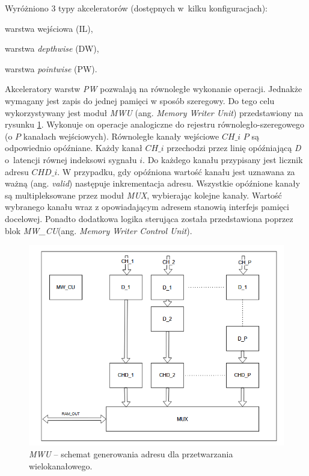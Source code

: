 Wyróżniono 3 typy akceleratorów (dostępnych w~kilku konfiguracjach):
\begin{description}
\item warstwa wejściowa (IL),
\item warstwa \emph{depthwise} (DW),
\item warstwa \emph{pointwise} (PW).
\end{description}

Akceleratory warstw \emph{PW} pozwalają na równoległe wykonanie operacji.
Jednakże wymagany jest zapis do jednej pamięci w sposób szeregowy.
Do tego celu  wykorzystywany jest moduł \emph{MWU} (ang. \emph{Memory Writer Unit}) przedstawiony na rysunku \ref{fig:mwu}.
Wykonuje on operacje analogiczne do rejestru równoległo-szeregowego (o $P$ kanałach wejściowych).
Równoległe kanały wejściowe $CH\_i$ $P$ są odpowiednio opóźniane. 
Każdy kanał $CH\_{i}$ przechodzi przez linię opóźniającą \emph{D} o~latencji równej indeksowi sygnału $i$.
Do każdego kanału przypisany jest licznik adresu $CHD\_i$.
W przypadku, gdy opóźniona wartość kanału jest uznawana za ważną (ang. \emph{valid}) następuje inkrementacja adresu.
Wszystkie opóźnione kanały są multipleksowane przez moduł \emph{MUX}, wybierając kolejne kanały.
Wartość wybranego kanału wraz z opowiadającym adresem stanowią interfejs pamięci docelowej.
Ponadto dodatkowa logika sterująca została przedstawiona poprzez blok \emph{MW\_CU}(ang. \emph{Memory Writer Control Unit}).
\begin{figure}
    \centering
    \includegraphics[width=0.8\linewidth]{images/MWU.png}
    \caption{\emph{MWU} -- schemat generowania adresu dla przetwarzania wielokanałowego.}
    \label{fig:mwu}
\end{figure}

